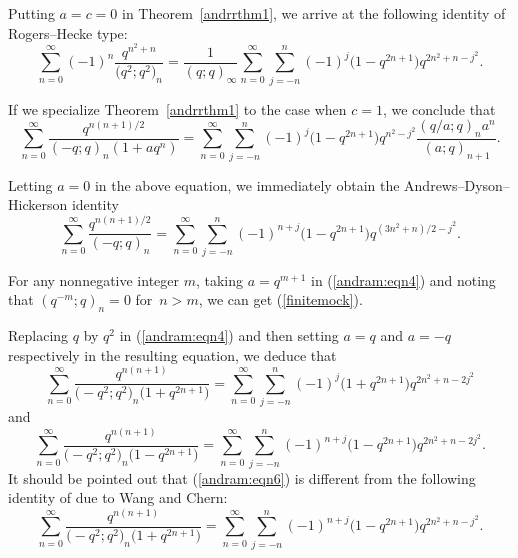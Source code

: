 \documentclass[10pt,a4paper]{amsart}
\numberwithin{equation}{section}
\begin{document}
Putting $a=c=0$ in Theorem~\ref{andrrthm1}, we arrive at the following identity of Rogers--Hecke type:
\begin{equation*}%
	\sum_{n=0}^\infty (-1)^n \frac{q^{n^2+n}}{\bigl(q^2; q^2\bigr)_n}
	=\frac{1}{(q; q)_\infty} \sum_{n=0}^\infty \sum_{j=-n}^n (-1)^j \bigl(1-q^{2n+1}\bigr) q^{2n^2+n-j^2}.
\end{equation*}

If we specialize Theorem~\ref{andrrthm1} to the case when $c=1$, we conclude that
\begin{equation}\label{andram:eqn4}
	\sum_{n=0}^\infty \frac{q^{n(n+1)/2}}{(-q; q)_n (1+aq^n)}
	=\sum_{n=0}^\infty \sum_{j=-n}^n (-1)^j \bigl(1-q^{2n+1}\bigr) q^{n^2-j^2} \frac{(q/a; q)_n a^n}{(a; q)_{n+1}}.
\end{equation}

Letting $a=0$ in the above equation, we immediately obtain the Andrews--Dyson--Hickerson identity \cite{ADH1988}
\begin{equation*}%
	\sum_{n=0}^\infty \frac{q^{n(n+1)/2}}{(-q; q)_n }
	=\sum_{n=0}^\infty \sum_{j=-n}^n (-1)^{n+j} \bigl(1-q^{2n+1}\bigr) q^{(3n^2+n)/2-j^2}.
\end{equation*}

For any nonnegative integer $m$, taking $a=q^{m+1}$ in (\ref{andram:eqn4}) and noting that $(q^{-m}; q)_n=0$ for~${n>m}$,
we can get (\ref{finitemock}).


Replacing $q$ by $q^2$ in (\ref{andram:eqn4}) and then setting $a=q$ and $a=-q$ respectively in the resulting equation, we deduce that
\begin{equation}\label{andram:eqn6}
	\sum_{n=0}^\infty \frac{q^{n(n+1)}}{\bigl(-q^2; q^2\bigr)_n \bigl(1+q^{2n+1}\bigr)}
	=\sum_{n=0}^\infty \sum_{j=-n}^n (-1)^{j} \bigl(1+q^{2n+1}\bigr) q^{2n^2+n-2j^2}
\end{equation}
and
\begin{equation*}%
	\sum_{n=0}^\infty \frac{q^{n(n+1)}}{\bigl(-q^2; q^2\bigr)_n \bigl(1-q^{2n+1}\bigr)}
	=\sum_{n=0}^\infty \sum_{j=-n}^n (-1)^{n+j} \bigl(1-q^{2n+1}\bigr) q^{2n^2+n-2j^2}.
\end{equation*}
It should be pointed out that (\ref{andram:eqn6}) is different from the following identity of \cite[equation~(2.8)]{WangChern2019} due to Wang and Chern:
\begin{equation*}%
	\sum_{n=0}^\infty \frac{q^{n(n+1)}}{\bigl(-q^2; q^2\bigr)_n \bigl(1+q^{2n+1}\bigr)}
	=\sum_{n=0}^\infty \sum_{j=-n}^n (-1)^{n+j} \bigl(1-q^{2n+1}\bigr) q^{2n^2+n-j^2}.
\end{equation*}
\end{document}
